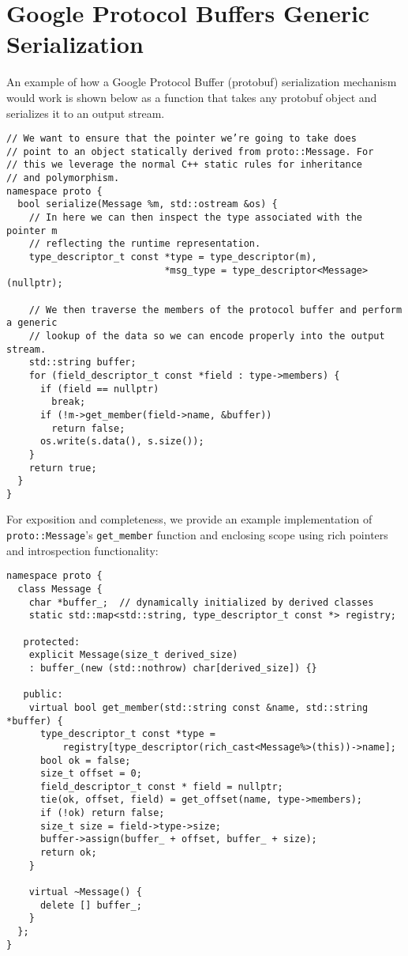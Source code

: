 \section{Google Protocol Buffers Generic Serialization}
\label{appendix:protobuf-example}
An example of how a Google Protocol Buffer (protobuf) serialization mechanism
would work is shown below as a function that takes any protobuf object and
serializes it to an output stream.

\begin{verbatim}
// We want to ensure that the pointer we’re going to take does
// point to an object statically derived from proto::Message. For
// this we leverage the normal C++ static rules for inheritance
// and polymorphism.
namespace proto {
  bool serialize(Message %m, std::ostream &os) {
    // In here we can then inspect the type associated with the pointer m
    // reflecting the runtime representation.
    type_descriptor_t const *type = type_descriptor(m),
                            *msg_type = type_descriptor<Message>(nullptr);

    // We then traverse the members of the protocol buffer and perform a generic
    // lookup of the data so we can encode properly into the output stream.
    std::string buffer;
    for (field_descriptor_t const *field : type->members) {
      if (field == nullptr)
        break;
      if (!m->get_member(field->name, &buffer))
        return false;
      os.write(s.data(), s.size());
    }
    return true;
  }
}
\end{verbatim}

For exposition and completeness, we provide an example implementation of
\verb+proto::Message+’s \verb+get_member+ function and enclosing scope using
rich pointers and introspection functionality:

\begin{verbatim}
namespace proto {
  class Message {
    char *buffer_;  // dynamically initialized by derived classes
    static std::map<std::string, type_descriptor_t const *> registry;

   protected:
    explicit Message(size_t derived_size)
    : buffer_(new (std::nothrow) char[derived_size]) {}

   public:
    virtual bool get_member(std::string const &name, std::string *buffer) {
      type_descriptor_t const *type =
          registry[type_descriptor(rich_cast<Message%>(this))->name];
      bool ok = false;
      size_t offset = 0;
      field_descriptor_t const * field = nullptr;
      tie(ok, offset, field) = get_offset(name, type->members);
      if (!ok) return false;
      size_t size = field->type->size;
      buffer->assign(buffer_ + offset, buffer_ + size);
      return ok;
    }

    virtual ~Message() {
      delete [] buffer_;
    }
  };
}
\end{verbatim}


